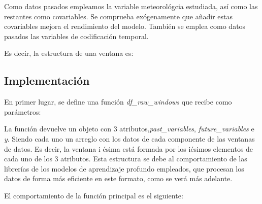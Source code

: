 Como datos pasados empleamos la variable meteorológcia estudiada, así como las restantes como covariables. Se comprueba exógenamente que 
añadir estas covariables mejora el rendimiento del modelo. También se emplea como datos pasados las variables de codificación temporal. 

Es decir, la estructura de una ventana es:

\subsection{Implementación}
En primer lugar, se define una función \textit{df\_raw\_windows} que recibe como parámetros:

La función devuelve un objeto con 3 atributos,\textit{past\_variables}, \textit{future\_variables} e \textit{y}.
Siendo cada uno un arreglo con los datos de cada componente de las ventanas de datos. Es decir, la ventana i ésima
está formada por los iésimos elementos de cada uno de los 3 atributos. Esta estructura se debe al comportamiento
de las librerías de los modelos de aprendizaje profundo empleados, que procesan los datos de forma más eficiente en este formato,
como se verá más adelante.

\bigskip
El comportamiento de la función principal es el siguiente:

